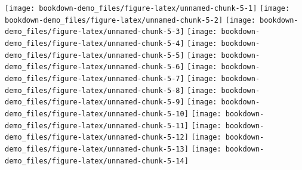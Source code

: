 \documentclass[
  12pt,
  a4paper,
  openany]{book}
\newenvironment{Shaded}{\begin{snugshade}}{\end{snugshade}}
\newcommand{\DataTypeTok}[1]{\textcolor[rgb]{0.13,0.29,0.53}{#1}}
\newcommand{\DecValTok}[1]{\textcolor[rgb]{0.00,0.00,0.81}{#1}}
\newcommand{\FloatTok}[1]{\textcolor[rgb]{0.00,0.00,0.81}{#1}}
\newcommand{\KeywordTok}[1]{\textcolor[rgb]{0.13,0.29,0.53}{\textbf{#1}}}
\newcommand{\NormalTok}[1]{#1}
\newcommand{\OperatorTok}[1]{\textcolor[rgb]{0.81,0.36,0.00}{\textbf{#1}}}
\newcommand{\OtherTok}[1]{\textcolor[rgb]{0.56,0.35,0.01}{#1}}
\newcommand{\StringTok}[1]{\textcolor[rgb]{0.31,0.60,0.02}{#1}}
\begin{document}
\texttt{[image: bookdown-demo\_files/figure-latex/unnamed-chunk-5-1]} \texttt{[image: bookdown-demo\_files/figure-latex/unnamed-chunk-5-2]} \texttt{[image: bookdown-demo\_files/figure-latex/unnamed-chunk-5-3]} \texttt{[image: bookdown-demo\_files/figure-latex/unnamed-chunk-5-4]} \texttt{[image: bookdown-demo\_files/figure-latex/unnamed-chunk-5-5]} \texttt{[image: bookdown-demo\_files/figure-latex/unnamed-chunk-5-6]} \texttt{[image: bookdown-demo\_files/figure-latex/unnamed-chunk-5-7]} \texttt{[image: bookdown-demo\_files/figure-latex/unnamed-chunk-5-8]} \texttt{[image: bookdown-demo\_files/figure-latex/unnamed-chunk-5-9]} \texttt{[image: bookdown-demo\_files/figure-latex/unnamed-chunk-5-10]} \texttt{[image: bookdown-demo\_files/figure-latex/unnamed-chunk-5-11]} \texttt{[image: bookdown-demo\_files/figure-latex/unnamed-chunk-5-12]} \texttt{[image: bookdown-demo\_files/figure-latex/unnamed-chunk-5-13]} \texttt{[image: bookdown-demo\_files/figure-latex/unnamed-chunk-5-14]}
\normalsize

\scriptsize

\begin{Shaded}
\end{Shaded}
\end{document}
